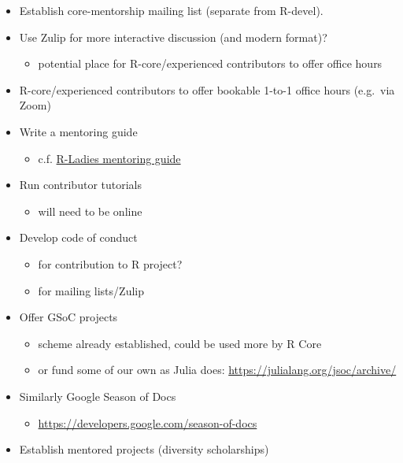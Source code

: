 \documentclass[]{book}
\providecommand{\tightlist}{%
  \setlength{\itemsep}{0pt}\setlength{\parskip}{0pt}}
\begin{document}
\begin{itemize}
\item
  Establish core-mentorship mailing list (separate from R-devel).
\item
  Use Zulip for more interactive discussion (and modern format)?

  \begin{itemize}
  \tightlist
  \item
    potential place for R-core/experienced contributors to offer office hours
  \end{itemize}
\item
  R-core/experienced contributors to offer bookable 1-to-1 office hours (e.g.~via Zoom)
\item
  Write a mentoring guide

  \begin{itemize}
  \tightlist
  \item
    c.f. \href{https://tinyurl.com/rladies-mentoring-guidelines}{R-Ladies mentoring guide}
  \end{itemize}
\item
  Run contributor tutorials

  \begin{itemize}
  \tightlist
  \item
    will need to be online
  \end{itemize}
\item
  Develop code of conduct

  \begin{itemize}
  \tightlist
  \item
    for contribution to R project?
  \item
    for mailing lists/Zulip
  \end{itemize}
\item
  Offer GSoC projects

  \begin{itemize}
  \tightlist
  \item
    scheme already established, could be used more by R Core
  \item
    or fund some of our own as Julia does: \url{https://julialang.org/jsoc/archive/}
  \end{itemize}
\item
  Similarly Google Season of Docs

  \begin{itemize}
  \tightlist
  \item
    \url{https://developers.google.com/season-of-docs}
  \end{itemize}
\item
  Establish mentored projects (diversity scholarships)


\end{itemize}
\end{document}
